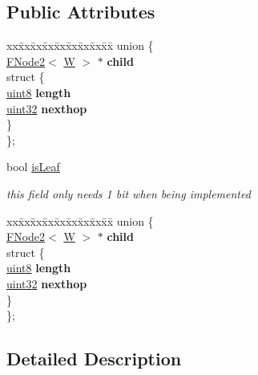 \subsection*{Public Attributes}
\begin{DoxyCompactItemize}
\item 
\begin{tabbing}
xx\=xx\=xx\=xx\=xx\=xx\=xx\=xx\=xx\=\kill
union \{\\
\hyperlink{structFNode2}{FNode2}$<$ \hyperlink{test__u128_8cpp_ab21b528bc38899d04d3a7053e52fb797}{W} $>$ $\ast$ {\bfseries child}\\
\>struct \{\\
\hyperlink{types_8h_a34ecedcf03a70dc91e4616212d79267d}{uint8} {\bfseries length}\\
\hyperlink{types_8h_abd01e8e67e3d94cab04ecaaf4f85ac1b}{uint32} {\bfseries nexthop}\\
\>\} \\
\}; \\

\end{tabbing}\item 
bool \hyperlink{structFNode2_1_1Entry_adcb357105740b1e75920b843de5cbbdf}{is\-Leaf}
\begin{DoxyCompactList}\small\item\em this field only needs 1 bit when being implemented \end{DoxyCompactList}\item 
\begin{tabbing}
xx\=xx\=xx\=xx\=xx\=xx\=xx\=xx\=xx\=\kill
union \{\\
\hyperlink{structFNode2}{FNode2}$<$ \hyperlink{test__u128_8cpp_ab21b528bc38899d04d3a7053e52fb797}{W} $>$ $\ast$ {\bfseries child}\\
\>struct \{\\
\hyperlink{types_8h_a34ecedcf03a70dc91e4616212d79267d}{uint8} {\bfseries length}\\
\hyperlink{types_8h_abd01e8e67e3d94cab04ecaaf4f85ac1b}{uint32} {\bfseries nexthop}\\
\>\} \\
\}; \\

\end{tabbing}\end{DoxyCompactItemize}


\subsection{Detailed Description}
